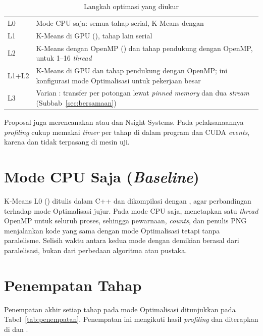 \begin{table}[H]
\centering
\caption{Langkah optimasi yang diukur}
\label{tab:langkah}
\begin{tabularx}{\textwidth}{|L{2cm}|Y|}
\hline
{} &  \\ \hline
L0 & Mode CPU saja: semua tahap serial, K-Means dengan  \\ \hline
L1 & K-Means di GPU (), tahap lain serial \\ \hline
L2 & K-Means dengan OpenMP () dan tahap pendukung dengan OpenMP, untuk 1--16 \emph{thread} \\ \hline
L1+L2 & K-Means di GPU dan tahap pendukung dengan OpenMP; ini konfigurasi mode Optimalisasi untuk pekerjaan besar \\ \hline
L3 & Varian : transfer per potongan lewat \emph{pinned memory} dan dua \emph{stream} (Subbab~\ref{sec:bersamaan}) \\ \hline
\end{tabularx}
\end{table}

Proposal juga merencanakan  atau  dan Nsight Systems. Pada pelaksanaannya \emph{profiling} cukup memakai \emph{timer} per tahap di dalam program dan CUDA \emph{events}, karena  dan  tidak terpasang di mesin uji.

\section{Mode CPU Saja (\emph{Baseline})}
\label{sec:l0}
K-Means L0 () ditulis dalam C++ dan dikompilasi dengan , agar perbandingan terhadap mode Optimalisasi jujur. Pada mode CPU saja,  menetapkan satu \emph{thread} OpenMP untuk seluruh proses, sehingga pewarnaan, \emph{counts}, dan penulis PNG menjalankan kode yang sama dengan mode Optimalisasi tetapi tanpa paralelisme. Selisih waktu antara kedua mode dengan demikian berasal dari paralelisasi, bukan dari perbedaan algoritma atau pustaka.

\section{Penempatan Tahap}
\label{sec:penempatan}
Penempatan akhir setiap tahap pada mode Optimalisasi ditunjukkan pada Tabel~\ref{tab:penempatan}. Penempatan ini mengikuti hasil \emph{profiling} dan diterapkan di  dan .

